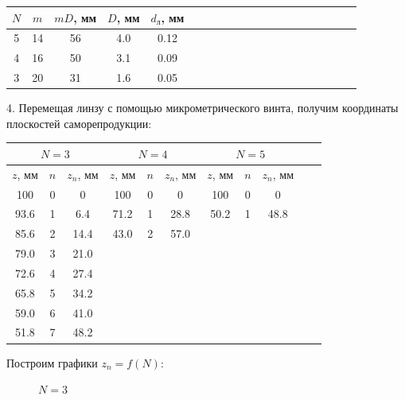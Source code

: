 \documentclass[14pt]{article}
\begin{document}
\begin{center}
\begin{tabular}{|c|c|c|c|c|c|c|c|c|c|c|c|c|c|c|c|c|c|c|c|}
\hline
$N$		&	$m$		&	$mD$, мм	&	$D$, мм		&	$d_\text{л}$, мм	\\
\hline
5		&	14		&	56			&	4.0			&	0.12				\\
\hline
4		&	16		&	50			&	3.1			&	0.09				\\
\hline
3		&	20		&	31			&	1.6			&	0.05				\\
\hline
\end{tabular}
\end{center}

4. Перемещая линзу с помощью микрометрического винта, получим координаты плоскостей саморепродукции:

\begin{center}
\begin{tabular}{|c|c|c|c|c|c|c|c|c|c|c|}
\hline
\multicolumn{3}{|c|}{$N = 3$}	&	\multicolumn{3}{|c|}{$N = 4$}	&	\multicolumn{3}{|c|}{$N = 5$}		\\
\hline
$z$, мм	&	$n$	&	$z_n$, мм	&	$z$, мм	&	$n$	&	$z_n$, мм	&	$z$, мм	&	$n$	&	$z_n$, мм		\\
\hline
100		&	0	&	0			&	100		&	0	&	0			&	100		&	0	&	0				\\
\hline
93.6	&	1	&	6.4			&	71.2	&	1	&	28.8		&	50.2	&	1	&	48.8			\\
\hline
85.6	&	2	&	14.4		&	43.0	&	2	&	57.0		&			&		&					\\
\hline
79.0	&	3	&	21.0		&			&		&				&			&		&					\\
\hline
72.6	&	4	&	27.4		&			&		&				&			&		&					\\
\hline
65.8	&	5	&	34.2		&			&		&				&			&		&					\\
\hline
59.0	&	6	&	41.0		&			&		&				&			&		&					\\
\hline
51.8	&	7	&	48.2		&			&		&				&			&		&					\\
\hline
\end{tabular}
\end{center}

\newpage
Построим графики $z_n = f(N)$:

\begin{figure}[h!]
\centering
{}
\captionsetup{labelformat=empty}
\caption{$N = 3$}
\end{figure}
\end{document}
